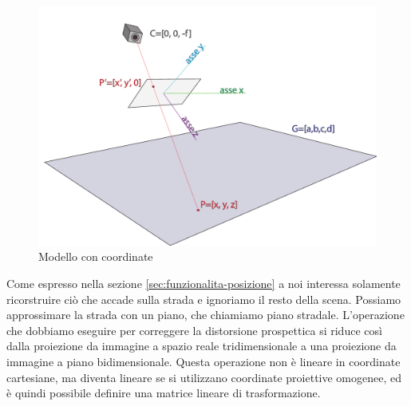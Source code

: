 \begin{figure}
    \centering
    \includegraphics[width=\textwidth]{images/camera coords.pdf}
    \caption{Modello con coordinate}
    \label{fig:camera coords}
\end{figure}

Come espresso nella sezione \ref{sec:funzionalita-posizione} a noi interessa solamente ricorstruire ciò che accade sulla strada e ignoriamo il resto della scena.
Possiamo approssimare la strada con un piano, che chiamiamo piano stradale.
L'operazione che dobbiamo eseguire per correggere la distorsione prospettica si riduce così dalla proiezione da immagine a spazio reale tridimensionale a una proiezione da immagine a piano bidimensionale.
Questa operazione non è lineare in coordinate cartesiane, ma diventa lineare se si utilizzano coordinate proiettive omogenee, ed è quindi possibile definire una matrice lineare di trasformazione.

